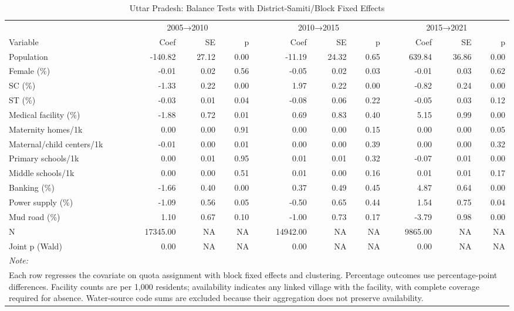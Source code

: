 \begin{table}
\centering
\caption{\label{tab:balance_fe_up}Uttar Pradesh: Balance Tests with District-Samiti/Block Fixed Effects}
\centering
\fontsize{8}{10}\selectfont
\begin{tabular}[t]{lrrrrrrrrr}
\toprule
\multicolumn{1}{c}{ } & \multicolumn{3}{c}{2005→2010} & \multicolumn{3}{c}{2010→2015} & \multicolumn{3}{c}{2015→2021} \\
\cmidrule(l{3pt}r{3pt}){2-4} \cmidrule(l{3pt}r{3pt}){5-7} \cmidrule(l{3pt}r{3pt}){8-10}
Variable & Coef & SE & p & Coef & SE & p & Coef & SE & p\\
\midrule
Population & -140.82 & 27.12 & 0.00 & -11.19 & 24.32 & 0.65 & 639.84 & 36.86 & 0.00\\
Female (\%) & -0.01 & 0.02 & 0.56 & -0.05 & 0.02 & 0.03 & -0.01 & 0.03 & 0.62\\
SC (\%) & -1.33 & 0.22 & 0.00 & 1.97 & 0.22 & 0.00 & -0.82 & 0.24 & 0.00\\
ST (\%) & -0.03 & 0.01 & 0.04 & -0.08 & 0.06 & 0.22 & -0.05 & 0.03 & 0.12\\
Medical facility (\%) & -1.88 & 0.72 & 0.01 & 0.69 & 0.83 & 0.40 & 5.15 & 0.99 & 0.00\\
\addlinespace
Maternity homes/1k & 0.00 & 0.00 & 0.91 & 0.00 & 0.00 & 0.15 & 0.00 & 0.00 & 0.05\\
Maternal/child centers/1k & -0.01 & 0.00 & 0.01 & 0.00 & 0.00 & 0.39 & 0.00 & 0.00 & 0.32\\
Primary schools/1k & 0.00 & 0.01 & 0.95 & 0.01 & 0.01 & 0.32 & -0.07 & 0.01 & 0.00\\
Middle schools/1k & 0.00 & 0.00 & 0.51 & 0.01 & 0.00 & 0.16 & 0.01 & 0.01 & 0.17\\
Banking (\%) & -1.66 & 0.40 & 0.00 & 0.37 & 0.49 & 0.45 & 4.87 & 0.64 & 0.00\\
\addlinespace
Power supply (\%) & -1.09 & 0.56 & 0.05 & -0.50 & 0.65 & 0.44 & 1.54 & 0.75 & 0.04\\
Mud road (\%) & 1.10 & 0.67 & 0.10 & -1.00 & 0.73 & 0.17 & -3.79 & 0.98 & 0.00\\
N & 17345.00 & NA & NA & 14942.00 & NA & NA & 9865.00 & NA & NA\\
Joint p (Wald) & 0.00 & NA & NA & 0.00 & NA & NA & 0.00 & NA & NA\\
\bottomrule
\multicolumn{10}{l}{\rule{0pt}{1em}\textit{Note: }}\\
\multicolumn{10}{l}{\rule{0pt}{1em}Each row regresses the covariate on quota assignment with block fixed effects and clustering. Percentage outcomes use percentage-point differences. Facility counts are per 1,000 residents; availability indicates any linked village with the facility, with complete coverage required for absence. Water-source code sums are excluded because their aggregation does not preserve availability.}\\
\end{tabular}
\end{table}
